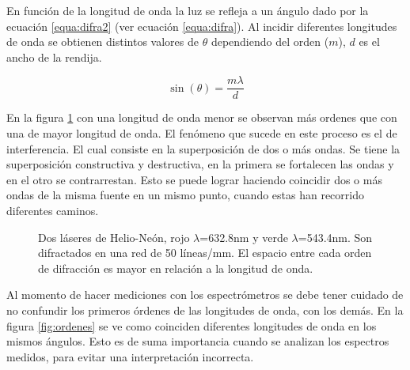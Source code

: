 En función de la longitud de onda la luz se refleja a un ángulo dado por la ecuación \ref{equa:difra2} (ver ecuación \ref{equa:difra}). Al incidir diferentes longitudes de onda se obtienen distintos valores de $\theta$ dependiendo del orden ($m$), $d$ es el ancho de la rendija. 

\begin{equation}
\sin(\theta) = \frac{m \lambda}{d}
\label{equa:difra2}
\end{equation}

En la figura \ref{fig:difracro} con una longitud de onda menor se observan más ordenes que con una de mayor longitud de onda. 
El fenómeno que sucede en este proceso es el de interferencia. El cual consiste en la superposición de dos o más ondas. Se tiene la superposición constructiva y destructiva, en la primera se fortalecen las ondas y en el otro se contrarrestan. Esto se puede lograr haciendo coincidir dos o más ondas de la misma fuente en un mismo punto, cuando estas han recorrido diferentes caminos.


\begin{figure}
	\centering
	\caption[Difracción de la luz con diferentes longitudes de onda.]{Dos láseres de Helio-Neón, rojo $\lambda$=632.8nm y verde $\lambda$=543.4nm. Son difractados en una red de 50 líneas/mm. El espacio entre cada orden de difracción es mayor en relación a la longitud de onda. \cite{laserGR}}
	\label{fig:difracro}
\end{figure}
Al momento de hacer mediciones con los espectrómetros se debe tener cuidado de no confundir los primeros órdenes de las longitudes de onda, con los demás. En la figura \ref{fig:ordenes} se ve como coinciden diferentes longitudes de onda en los mismos ángulos. Esto es de suma importancia cuando se analizan los espectros medidos, para evitar una interpretación incorrecta.

